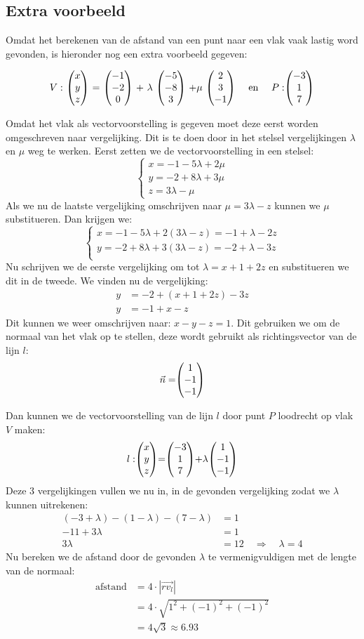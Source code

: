 \subsection{Extra voorbeeld}
Omdat het berekenen van de afstand van een punt naar een vlak vaak lastig word gevonden, is hieronder nog een extra voorbeeld gegeven:

\[V:\ \vecdrie{x}{y}{z} \ =\ \vecdrie{-1}{-2}{0} \ +\ \lambda\ \vecdrie{-5}{-8}{3} \ + \mu\ \vecdrie{2}{3}{-1} \quad \text{ en } \quad P: \vecdrie{-3}{1}{7}\]

Omdat het vlak als vectorvoorstelling is gegeven moet deze eerst worden om\-geschreven naar vergelijking. Dit is te doen door in het stelsel vergelijkingen $\lambda$ en $\mu$ weg te werken.
Eerst zetten we de vectorvoorstelling in een stelsel:
\[\begin{cases}
x = -1 -5\lambda + 2\mu\\
y = -2 + 8\lambda + 3\mu\\
z = 3\lambda - \mu  
\end{cases}
\] 
Als we nu de laatste vergelijking omschrijven naar $\mu = 3\lambda-z$ kunnen we $\mu$ substitueren. Dan krijgen we:
\[\begin{cases}
x = -1 -5\lambda + 2(3\lambda-z) = -1 + \lambda -2z\\
y = -2 + 8\lambda + 3(3\lambda-z) = -2 + \lambda - 3z\\
\end{cases}
\] 
Nu schrijven we de eerste vergelijking om tot $\lambda = x + 1 + 2z$ en substitueren we dit in de tweede. We vinden nu de vergelijking: 
\begin{align*}
    y &= -2+(x+1+2z) -3z \\
    y &= -1 + x - z
\end{align*}
Dit kunnen we weer omschrijven naar: $x-y-z=1$. Dit gebruiken we om de normaal van het vlak op te stellen, deze wordt gebruikt als richtingsvector van de lijn $l$: 
\[\vec{n} = \vecdrie{1}{-1}{-1} \]
    
Dan kunnen we de vectorvoorstelling van de lijn $l$ door punt $P$ loodrecht op vlak $V$ maken: 
\[l: \vecdrie{x}{y}{z} = \vecdrie{-3}{1}{7} + \lambda \vecdrie{1}{-1}{-1} \]
Deze 3 vergelijkingen vullen we nu in, in de gevonden vergelijking zodat we $\lambda$ kunnen uitrekenen:
\begin{align*}
    (-3 + \lambda) - (1-\lambda) - (7-\lambda) &= 1 \\
    -11 + 3\lambda &= 1 \\
    3\lambda &= 12 \quad \Rightarrow \quad \lambda = 4
\end{align*}
Nu bereken we de afstand door de gevonden $\lambda$ te vermenigvuldigen met de lengte van de normaal: 
\begin{align*}
    \text{afstand} &= 4\cdot |\overrightarrow{rv_{l}}| \\
    &= 4\cdot \sqrt{1^{2} + (-1)^{2} + (-1)^{2} } \\
    &= 4\sqrt{3} \approx 6.93
\end{align*}

